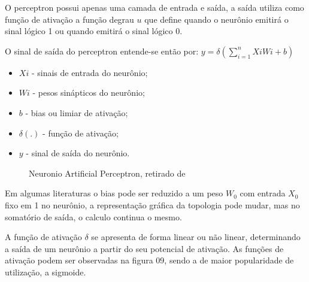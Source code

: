 \documentclass[	12pt, Times, openright, twoside, a4paper, english, brazil]{abntex2}
\begin{document}
            O perceptron \cite{Flavia2014} possui apenas uma camada de entrada e saída, a saída utiliza como função de ativação a função degrau $u$ que define quando o neurônio emitirá o sinal lógico 1 ou quando emitirá o sinal lógico 0.

            O sinal de saída do perceptron entende-se então por:
            $y= \delta(\sum_{i=1}^{n}XiWi+b)$
            \begin{itemize}
            	\item $ Xi $ - sinais de entrada do neurônio;
            	\item $ Wi $ - pesos sinápticos do neurônio;
            	\item $ b $ - bias ou limiar de ativação;
            	\item $ \delta(.) $ - função de ativação;
            	\item $ y $ - sinal de saída do neurônio.
            \end{itemize}
			
            \begin{figure}[!ht]
            \caption{Neuronio Artificial Perceptron, retirado de \cite{Junior2007} \cite{}\label{fig:perceptron}}
            \end{figure}
			
			     Em algumas literaturas o bias pode ser reduzido a um peso $W_0$ com entrada $X_0$ fixo em 1 no neurônio, a representação gráfica da topologia pode mudar, mas no somatório de saída, o calculo continua o mesmo.
			
			     A função de ativação $\delta$ se apresenta de forma linear ou não linear, determinando a saída de um neurônio a partir do seu potencial de ativação. 
			     As funções de ativação podem ser observadas na figura 09, sendo a de maior popularidade de utilização, a sigmoide.
			
\end{document}
